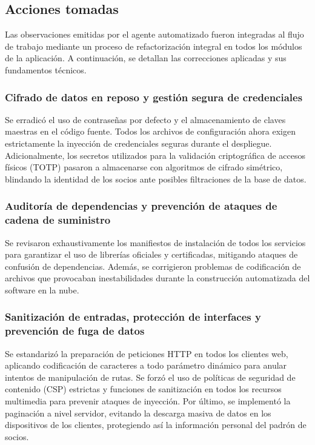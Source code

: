 \newpage

\subsection{Acciones tomadas}

Las observaciones emitidas por el agente automatizado fueron integradas al flujo de trabajo mediante un proceso de refactorización integral en todos los módulos de la aplicación. A continuación, se detallan las correcciones aplicadas y sus fundamentos técnicos.

\subsubsection{Cifrado de datos en reposo y gestión segura de credenciales}

Se erradicó el uso de contraseñas por defecto y el almacenamiento de claves maestras en el código fuente. Todos los archivos de configuración ahora exigen estrictamente la inyección de credenciales seguras durante el despliegue. Adicionalmente, los secretos utilizados para la validación criptográfica de accesos físicos (TOTP) pasaron a almacenarse con algoritmos de cifrado simétrico, blindando la identidad de los socios ante posibles filtraciones de la base de datos. 

\subsubsection{Auditoría de dependencias y prevención de ataques de cadena de suministro}

Se revisaron exhaustivamente los manifiestos de instalación de todos los servicios para garantizar el uso de librerías oficiales y certificadas, mitigando ataques de confusión de dependencias. Además, se corrigieron problemas de codificación de archivos que provocaban inestabilidades durante la construcción automatizada del software en la nube.

\subsubsection{Sanitización de entradas, protección de interfaces y prevención de fuga de datos}

Se estandarizó la preparación de peticiones HTTP en todos los clientes web, aplicando codificación de caracteres a todo parámetro dinámico para anular intentos de manipulación de rutas. Se forzó el uso de políticas de seguridad de contenido (CSP) estrictas y funciones de sanitización en todos los recursos multimedia para prevenir ataques de inyección. Por último, se implementó la paginación a nivel servidor, evitando la descarga masiva de datos en los dispositivos de los clientes, protegiendo así la información personal del padrón de socios.

